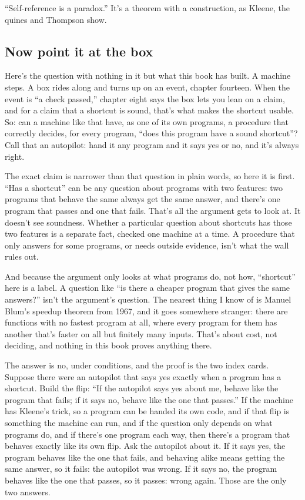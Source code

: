\documentclass[11pt,twoside]{article}
\theoremstyle{thielethm}
\theoremstyle{thieledef}
\theoremstyle{thieledef}
\theoremstyle{thieledef}
\theoremstyle{thielethm}
\theoremstyle{thieleobs}
\theoremstyle{thielethm}
\begin{document}
``Self-reference is a paradox.'' It's a theorem with a construction, as Kleene, the quines and Thompson show.

\subsection{Now point it at the box}

Here's the question with nothing in it but what this book has built. A machine steps. A box rides along and turns up on an event, chapter fourteen. When the event is ``a check passed,'' chapter eight says the box lets you lean on a claim, and for a claim that a shortcut is sound, that's what makes the shortcut usable. So: can a machine like that have, as one of its own programs, a procedure that correctly decides, for every program, ``does this program have a sound shortcut''? Call that an autopilot: hand it any program and it says yes or no, and it's always right.

The exact claim is narrower than that question in plain words, so here it is first. ``Has a shortcut'' can be any question about programs with two features: two programs that behave the same always get the same answer, and there's one program that passes and one that fails. That's all the argument gets to look at. It doesn't see soundness. Whether a particular question about shortcuts has those two features is a separate fact, checked one machine at a time. A procedure that only answers for some programs, or needs outside evidence, isn't what the wall rules out.

And because the argument only looks at what programs do, not how, ``shortcut'' here is a label. A question like ``is there a cheaper program that gives the same answers?'' isn't the argument's question. The nearest thing I know of is Manuel Blum's speedup theorem from 1967, and it goes somewhere stranger: there are functions with no fastest program at all, where every program for them has another that's faster on all but finitely many inputs. That's about cost, not deciding, and nothing in this book proves anything there.

The answer is no, under conditions, and the proof is the two index cards. Suppose there were an autopilot that says yes exactly when a program has a shortcut. Build the flip: ``If the autopilot says yes about me, behave like the program that fails; if it says no, behave like the one that passes.'' If the machine has Kleene's trick, so a program can be handed its own code, and if that flip is something the machine can run, and if the question only depends on what programs do, and if there's one program each way, then there's a program that behaves exactly like its own flip. Ask the autopilot about it. If it says yes, the program behaves like the one that fails, and behaving alike means getting the same answer, so it fails: the autopilot was wrong. If it says no, the program behaves like the one that passes, so it passes: wrong again. Those are the only two answers.
\end{document}
